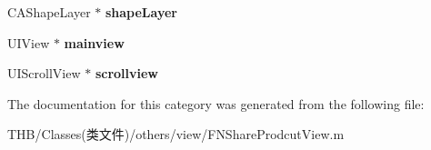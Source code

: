\begin{DoxyCompactItemize}
C\+A\+Shape\+Layer $\ast$ {\bfseries shape\+Layer}
\item 
\mbox{\label{category_f_n_share_prodcut_view_07_08_a7a518f6d6c825ca4c1b97d8abe6ae5f9}} 
U\+I\+View $\ast$ {\bfseries mainview}
\item 
\mbox{\label{category_f_n_share_prodcut_view_07_08_af7f93726e22ebb92bb025d7015c63f67}} 
U\+I\+Scroll\+View $\ast$ {\bfseries scrollview}
\end{DoxyCompactItemize}


The documentation for this category was generated from the following file\+:\begin{DoxyCompactItemize}
\item 
T\+H\+B/\+Classes(类文件)/others/view/F\+N\+Share\+Prodcut\+View.\+m\end{DoxyCompactItemize}
